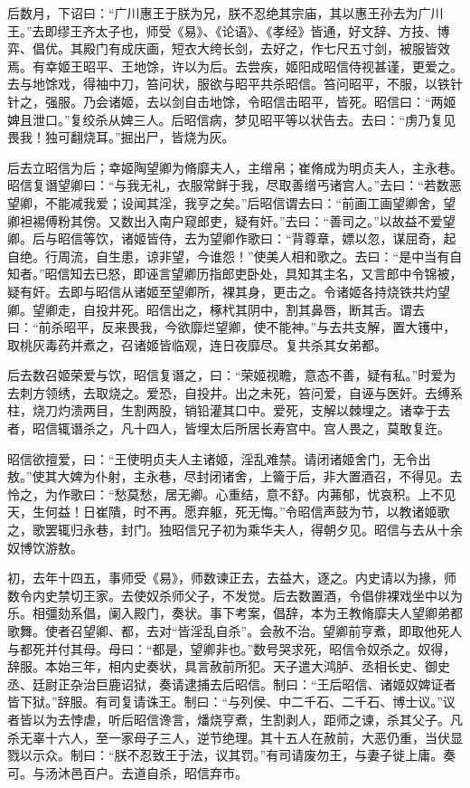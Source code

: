 \documentclass[]{article}
\begin{document}
后数月，下诏曰：``广川惠王于朕为兄，朕不忍绝其宗庙，其以惠王孙去为广川王。''去即缪王齐太子也，师受《易》、《论语》、《孝经》皆通，好文辞、方技、博弈、倡优。其殿门有成庆画，短衣大绔长剑，去好之，作七尺五寸剑，被服皆效焉。有幸姬王昭平、王地馀，许以为后。去尝疾，姬阳成昭信侍视甚谨，更爱之。去与地馀戏，得袖中刀，笞问状，服欲与昭平共杀昭信。笞问昭平，不服，以铁针针之，强服。乃会诸姬，去以剑自击地馀，令昭信击昭平，皆死。昭信曰：``两姬婢且泄口。''复绞杀从婢三人。后昭信病，梦见昭平等以状告去。去曰：``虏乃复见畏我！独可翻烧耳。''掘出尸，皆烧为灰。

后去立昭信为后；幸姬陶望卿为脩靡夫人，主缯帛；崔脩成为明贞夫人，主永巷。昭信复谮望卿曰：``与我无礼，衣服常鲜于我，尽取善缯丐诸宫人。''去曰：``若数恶望卿，不能减我爱；设闻其淫，我亨之矣。''后昭信谓去曰：``前画工画望卿舍，望卿袒裼傅粉其傍。又数出入南户窥郎吏，疑有奸。''去曰：``善司之。''以故益不爱望卿。后与昭信等饮，诸姬皆侍，去为望卿作歌曰：``背尊章，嫖以忽，谋屈奇，起自绝。行周流，自生患，谅非望，今谁怨！''使美人相和歌之。去曰：``是中当有自知者。''昭信知去已怒，即诬言望卿历指郎吏卧处，具知其主名，又言郎中令锦被，疑有奸。去即与昭信从诸姬至望卿所，裸其身，更击之。令诸姬各持烧铁共灼望卿。望卿走，自投井死。昭信出之，椓杙其阴中，割其鼻唇，断其舌。谓去曰：``前杀昭平，反来畏我，今欲靡烂望卿，使不能神。''与去共支解，置大镬中，取桃灰毒药并煮之，召诸姬皆临观，连日夜靡尽。复共杀其女弟都。

后去数召姬荣爱与饮，昭信复谮之，曰：``荣姬视瞻，意态不善，疑有私。''时爱为去刺方领绣，去取烧之。爱恐，自投井。出之未死，笞问爱，自诬与医奸。去缚系柱，烧刀灼溃两目，生割两股，销铅灌其口中。爱死，支解以棘埋之。诸幸于去者，昭信辄谮杀之，凡十四人，皆埋太后所居长寿宫中。宫人畏之，莫敢复迕。

昭信欲擅爱，曰：``王使明贞夫人主诸姬，淫乱难禁。请闭诸姬舍门，无令出敖。''使其大婢为仆射，主永巷，尽封闭诸舍，上籥于后，非大置酒召，不得见。去怜之，为作歌曰：``愁莫愁，居无卿。心重结，意不舒。内茀郁，忧哀积。上不见天，生何益！日崔隤，时不再。愿弃躯，死无悔。''令昭信声鼓为节，以教诸姬歌之，歌罢辄归永巷，封门。独昭信兄子初为乘华夫人，得朝夕见。昭信与去从十余奴博饮游敖。

初，去年十四五，事师受《易》，师数谏正去，去益大，逐之。内史请以为掾，师数令内史禁切王家。去使奴杀师父子，不发觉。后去数置酒，令倡俳裸戏坐中以为乐。相彊劾系倡，阑入殿门，奏状。事下考案，倡辞，本为王教脩靡夫人望卿弟都歌舞。使者召望卿、都，去对``皆淫乱自杀''。会赦不治。望卿前亨煮，即取他死人与都死并付其母。母曰：``都是，望卿非也。''数号哭求死，昭信令奴杀之。奴得，辞服。本始三年，相内史奏状，具言赦前所犯。天子遣大鸿胪、丞相长史、御史丞、廷尉正杂治巨鹿诏狱，奏请逮捕去后昭信。制曰：``王后昭信、诸姬奴婢证者皆下狱。''辞服。有司复请诛王。制曰：``与列侯、中二千石、二千石、博士议。''议者皆以为去悖虐，听后昭信谗言，燔烧亨煮，生割剥人，距师之谏，杀其父子。凡杀无辜十六人，至一家母子三人，逆节绝理。其十五人在赦前，大恶仍重，当伏显戮以示众。制曰：``朕不忍致王于法，议其罚。''有司请废勿王，与妻子徙上庸。奏可。与汤沐邑百户。去道自杀，昭信弃市。
\end{document}
